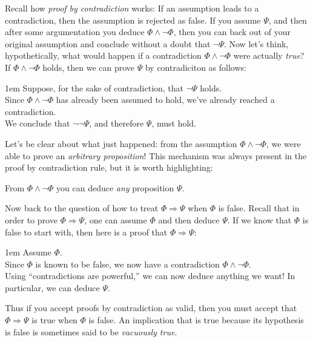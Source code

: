 \documentclass[12pt]{article}
\newcommand{\AND}{\wedge}
\newcommand{\ARR}{\Rightarrow}
\newcounter{rule}
\def\putRuleNumber{\refstepcounter{rule}\therule}
\newcommand{\indented}[1]{\begin{adjustwidth}{1em}{}#1\end{adjustwidth}}
\newcommand{\DRULE}[2]{\begin{tcolorbox}[title=Derived Rule \putRuleNumber: #1,colbacktitle=white,coltitle=black,colback=white]#2\end{tcolorbox}} %
\def\pA{\Phi}
\def\pB{\Psi}
\begin{document}
\def\vsp{\\[0.5em]}

Recall how \emph{proof by contradiction} works:
If an assumption leads to a contradiction, then the assumption is rejected as false.
If you assume $\pB$, and then after some argumentation you deduce $\pA\AND\neg\pA$, then
you can back out of your original assumption and conclude without a doubt that $\neg\pB$.
Now let's think, hypothetically, what would happen if a contradiction $\pA\AND\neg\pA$ were actually \emph{true}?
If $\pA\AND\neg\pA$ holds, then we can prove $\pB$ by contradiciton as follows:
\indented{
Suppose, for the sake of contradiction, that $\neg\pB$ holds.\vsp
Since $\pA\AND\neg\pA$ has already been assumed to hold, we've already reached a contradiction.\vsp
We conclude that $\neg\neg\pB$, and therefore $\pB$, must hold.
}
Let's be clear about what just happened: from the assumption $\pA\AND\neg\pA$, we were able to prove an \emph{arbitrary proposition}!
This mechanism was always present in the proof by contradiction rule, but it is worth highlighting:

\DRULE{Contradictions are powerful!}{
From $\pA\AND\neg\pA$ you can deduce \emph{any} proposition $\pB$.
}

Now back to the question of how to treat $\pA\ARR\pB$ when $\pA$ is false.
Recall that in order to prove $\pA\ARR\pB$, one can assume $\pA$ and then deduce $\pB$.
If we know that $\pA$ is false to start with, then here is a proof that $\pA\ARR\pB$:
\indented{
Assume $\pA$.\vsp
Since $\pA$ is known to be false, we now have a contradiction $\pA\AND\neg\pA$.\vsp
Using ``contradictions are powerful,'' we can now deduce anything we want! In particular, we can deduce $\pB$.
}
Thus if you accept proofs by contradiction as valid, then you must accept that $\pA\ARR\pB$ is true when $\pA$ is false.
An implication that is true because its hypothesis is false is sometimes said to be \emph{vacuously true}.
\end{document}
